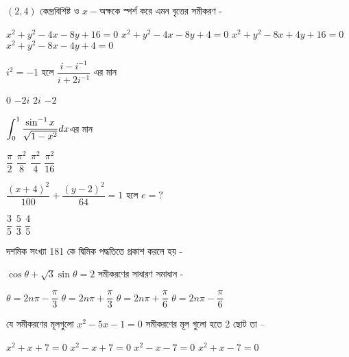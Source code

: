 \documentclass[addpoints]{exam}
\begin{document}
\begin{questions}
\question  $ (2,4) $ কেন্দ্রবিশিষ্ট ও $ x- $অক্ষকে স্পর্শ করে এমন বৃত্তের সমীকরণ -

\begin{oneparchoices}
\choice  $ x^{2}+y^{2}-4x-8y+16=0 $
\choice  $ x^{2}+y^{2}-4x-8y+4=0 $
\choice  $ x^{2}+y^{2}-8x+4y+16=0 $
\choice  $ x^{2}+y^{2}-8x-4y+4=0 $
\end{oneparchoices}

\question $ i^{2}=-1 $ হলে $ \dfrac{i-i^{-1}}{i+2i^{-1}} $ এর মান

\begin{oneparchoices}
\choice $ 0 $
\choice $ -2i $
\choice $ 2i $
\choice  $ -2 $

\end{oneparchoices}

\question  $ \mathlarger{\int_{0}^{1}\dfrac{\sin^{-1}x}{\sqrt{1-x^{2}}}dx} $এর মান

\begin{oneparchoices}
\choice $ \dfrac{\pi}{2} $
\choice $ \dfrac{\pi^{2}}{8} $
\choice $ \dfrac{\pi^{2}}{4} $
\choice $ \dfrac{\pi^{2}}{16} $

\end{oneparchoices}

\question  $ \dfrac{(x+4)^{2}}{100} +\dfrac{(y-2)^{2}}{64} =1 $ হলে $ e=? $

\begin{oneparchoices}
\choice $ \dfrac{3}{5} $
\choice $ \dfrac{5}{3} $
\choice $ \dfrac{4}{5} $

\end{oneparchoices}

\question দশমিক সংখ্যা 181 কে দ্বিমিক পদ্ধতিতে প্রকাশ করলে হয় - 

\begin{oneparchoices}
\end{oneparchoices}

\question $ \cos\theta +\sqrt{3}\sin\theta =2 $ সমীকরণের সাধারণ সমাধান -

\begin{oneparchoices}
\choice $ \theta = 2n\pi -\dfrac{\pi}{3} $
\choice $ \theta = 2n\pi +\dfrac{\pi}{3} $
\choice $ \theta = 2n\pi +\dfrac{\pi}{6} $
\choice $ \theta = 2n\pi -\dfrac{\pi}{6} $
\end{oneparchoices}

\question যে সমীকরণের মূলগুলো $ x^{2}-5x-1=0 $ সমীকরণের মূল গুলো হতে 2 ছোট তা – 

\begin{oneparchoices}
\choice $ x^{2}+x+7=0 $
\choice $ x^{2}-x+7=0 $
\choice $ x^{2}-x-7=0 $
\choice $ x^{2}+x-7=0 $
\end{oneparchoices}



\end{questions}
\end{document}
